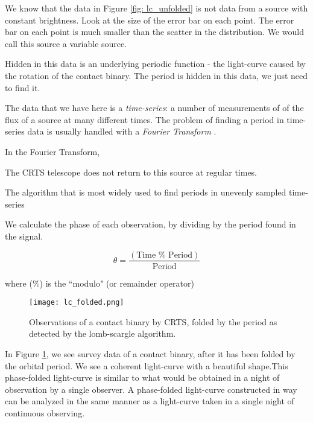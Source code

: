 \documentclass[12pt]{article} %
\numberwithin{equation}{section} %
\begin{document}
We know that the data in Figure \ref{fig: lc_unfolded} is not data from a source with constant brightness. Look at the size of the error bar on each point. The error bar on each point is much smaller than the scatter in the distribution. We would call this source a variable source.


Hidden in this data is an underlying periodic function - the light-curve caused by the rotation of the contact binary. The period is hidden in this data, we just need to find it.

The data that we have here is a \emph{time-series}: a number of measurements of of the flux of a source at many different times. The problem of finding a period in time-series data is usually handled with a \emph{Fourier Transform} .

In the Fourier Transform, 

The CRTS telescope does not return to this source at regular times.

The algorithm that is most widely used to find periods in unevenly sampled time-series \citet{scargle1982studies}

We calculate the phase of each observation, by dividing by the period found in the signal.

\begin{equation} \label{phase_fold}
\theta = \frac{(\text{Time } \% \text{ Period})}{\text{Period}}
\end{equation}

where (\%) is the ``modulo" (or remainder operator)

\begin{figure}[H]
\centering
\texttt{[image: lc\_folded.png]}
\caption{Observations of a contact binary by CRTS, folded by the period as detected by the lomb-scargle algorithm.}
\label{fig: lc_folded}
\end{figure}

In Figure \ref{fig: lc_folded}, we see survey data of a contact binary, after it has been folded by the orbital period. We see a coherent light-curve with a beautiful shape.This phase-folded light-curve is similar to what would be obtained in a night of observation by a single observer. A phase-folded light-curve constructed in way can be analyzed in the same manner as a light-curve taken in a single night of continuous observing.
\end{document}
